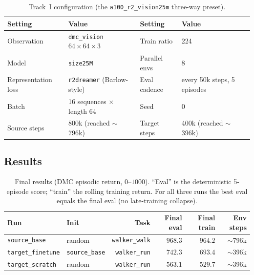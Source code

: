 \documentclass[11pt,a4paper]{article}
\begin{document}
\begin{table}[h]
\centering\small
\begin{tabular}{ll@{\hspace{1.4em}}ll}
\toprule
Setting & Value & Setting & Value \\
\midrule
Observation        & \texttt{dmc\_vision} $64{\times}64{\times}3$ & Train ratio   & 224 \\
Model              & \texttt{size25M}                            & Parallel envs & 8 \\
Representation loss & \texttt{r2dreamer} (Barlow-style)          & Eval cadence  & every 50k steps, 5 episodes \\
Batch              & 16 sequences $\times$ length 64             & Seed          & 0 \\
Source steps       & 800k (reached $\sim$796k)                   & Target steps  & 400k (reached $\sim$396k) \\
\bottomrule
\end{tabular}
\caption{Track~I configuration (the \texttt{a100\_r2\_vision25m} three-way preset).}
\label{tab:tracki-config}
\end{table}

\subsection{Results}
\label{sec:tracki-results}

\begin{table}[h]
\centering\small
\begin{tabular}{llrrrr}
\toprule
Run & Init & Task & Final eval & Final train & Env steps \\
\midrule
\texttt{source\_base}     & random            & \texttt{walker\_walk} & $968.3$ & $964.2$ & $\sim$796k \\
\texttt{target\_finetune} & \texttt{source\_base} & \texttt{walker\_run}  & $742.3$ & $693.4$ & $\sim$396k \\
\texttt{target\_scratch}  & random            & \texttt{walker\_run}  & $563.1$ & $529.7$ & $\sim$396k \\
\bottomrule
\end{tabular}
\caption{Final results (DMC episodic return, $0$--$1000$). ``Eval'' is the
deterministic 5-episode score; ``train'' the rolling training return. For all
three runs the best eval equals the final eval (no late-training collapse).}
\label{tab:tracki-results}
\end{table}
\end{document}
